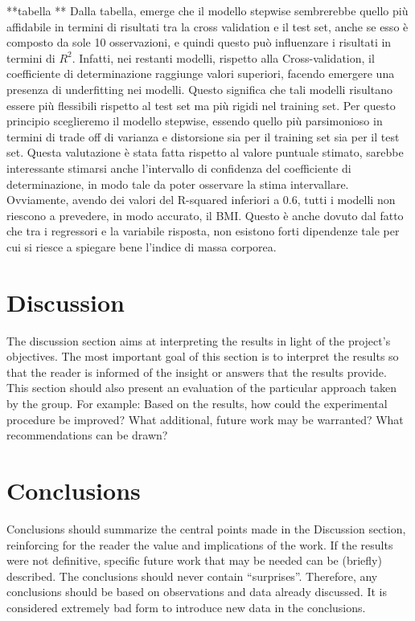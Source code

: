 **tabella **
Dalla tabella, emerge che il modello stepwise sembrerebbe quello più affidabile in termini di risultati tra la cross validation e il test set, anche se esso è composto da sole 10 osservazioni, e quindi questo può influenzare i risultati in termini di $R^2$. Infatti, nei restanti modelli, rispetto alla Cross-validation, il coefficiente di determinazione raggiunge valori superiori, facendo emergere una presenza di underfitting nei modelli. Questo significa che tali modelli risultano essere più flessibili rispetto al test set ma più rigidi nel training set. Per questo principio sceglieremo il modello stepwise, essendo quello più parsimonioso in termini di trade off di varianza e distorsione sia per il training set sia per il test set. Questa valutazione è stata fatta rispetto al valore puntuale stimato, sarebbe interessante stimarsi anche l’intervallo di confidenza del coefficiente di determinazione, in modo tale da poter osservare la stima intervallare. Ovviamente, avendo dei valori del R-squared inferiori a 0.6, tutti i modelli non riescono a prevedere, in modo accurato, il BMI. Questo è anche dovuto dal fatto che tra i regressori e la variabile risposta, non esistono forti dipendenze tale per cui si riesce a spiegare bene l’indice di massa corporea. 

\section{Discussion}
The discussion section aims at interpreting the results in light of the project's objectives. The most important goal of this section is to interpret the results so that the reader is informed of the insight or answers that the results provide. This section should also present an evaluation of the particular approach taken by the group. For example: Based on the results, how could the experimental procedure be improved? What additional, future work may be warranted? What recommendations can be drawn?

\section{Conclusions}
Conclusions should summarize the central points made in the Discussion section, reinforcing for the reader the value and implications of the work. If the results were not definitive, specific future work that may be needed can be (briefly) described. The conclusions should never contain ``surprises''. Therefore, any conclusions should be based on observations and data already discussed. It is considered extremely bad form to introduce new data in the conclusions.

